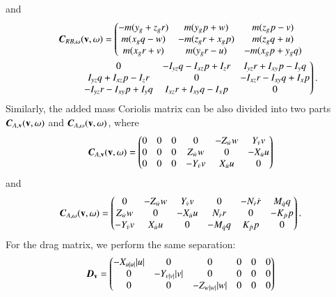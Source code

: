 and
\begin{gather}\label{EQ:CoriolisRigidBodyW}
\emph{\textbf{C}}_{RB,\vec{\omega}}(\vec{v},\vec{\omega})=
\left(
\begin{matrix} -m(y_{g}+z_{g}r)&m(y_{g}p+w)&m(z_{g}p-v)\\
m(x_{g}q-w)&-m(z_{g}r+x_{g}p)&m(z_{g}q+u)\\
m(x_{g}r+v)&m(y_{g}r-u)&-m(x_{g}p+y_{g}q)
\end{matrix}
\right.
 \nonumber\\
\qquad \qquad\left. \begin{matrix} 
0 & -I_{yz}q-I_{xz}p+I_{z}r & I_{yz}r+I_{xy}p-I_{y}q \\
I_{yz}q+I_{xz}p-I_{z}r &0& -I_{xz}r-I_{xy}q+I_{x}p \\
-I_{yz}r-I_{xy}p+I_{y}q&I_{xz}r+I_{xy}q-I_{x}p &0  \end{matrix}
\right).
\end{gather}
Similarly, the added mass Coriolis matrix can be also divided into two parts $\emph{\textbf{C}}_{A,\vec{v}}(\vec{v},\vec{\omega})$ and $\emph{\textbf{C}}_{A,\vec{\omega}}(\vec{v},\vec{\omega})$, where
\begin{align}
\emph{\textbf{C}}_{A,\vec{v}}(\vec{v},\vec{\omega})=
\begin{pmatrix}
0&0&0&0&-Z_{\dot{w}}w&Y_{\dot{v}}v\\
0&0&0&Z_{\dot{w}}w&0&-X_{\dot{u}}u\\
0&0&0&-Y_{\dot{v}}v&X_{\dot{u}}u&0
\end{pmatrix}
\end{align} 
and
\begin{align}
\emph{\textbf{C}}_{A,\vec{\omega}}(\vec{v},\vec{\omega})=
\begin{pmatrix}
0&-Z_{\dot{w}}w&Y_{\dot{v}}v&0&-N_{\dot{r}}\dot{r}&M_{\dot{q}}q\\
Z_{\dot{w}}w&0&-X_{\dot{u}}u&N_{\dot{r}}r&0&-K_{\dot{p}}p\\
-Y_{\dot{v}}v&X_{\dot{u}}u&0&-M_{\dot{q}}q&K_{\dot{p}}p&0
\end{pmatrix}.
\end{align}
For the drag matrix, we perform the same separation:
\begin{align}
\emph{\textbf{D}}_{\vec{v}}=
\begin{pmatrix}
-X_{u|u|}|u|&0&0&0&0&0\\
0&-Y_{v|v|}|v|&0&0&0&0\\
0&0&-Z_{w|w|}|w|&0&0&0\\
\end{pmatrix}
\end{align}
